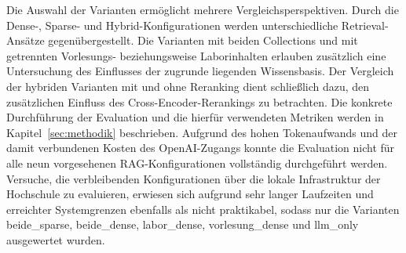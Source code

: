 Die Auswahl der Varianten ermöglicht mehrere Vergleichsperspektiven. Durch die Dense-, Sparse- und Hybrid-Konfigurationen werden unterschiedliche Retrieval-Ansätze gegenübergestellt. Die Varianten mit beiden Collections und mit getrennten Vorlesungs- beziehungsweise Laborinhalten erlauben zusätzlich eine Untersuchung des Einflusses der zugrunde liegenden Wissensbasis. Der Vergleich der hybriden Varianten mit und ohne Reranking dient schließlich dazu, den zusätzlichen Einfluss des Cross-Encoder-Rerankings zu betrachten. Die konkrete Durchführung der Evaluation und die hierfür verwendeten Metriken werden in Kapitel~\ref{sec:methodik} beschrieben. Aufgrund des hohen Tokenaufwands und der damit verbundenen Kosten des OpenAI-Zugangs konnte die Evaluation nicht für alle neun vorgesehenen RAG-Konfigurationen vollständig durchgeführt werden. Versuche, die verbleibenden Konfigurationen über die lokale Infrastruktur der Hochschule zu evaluieren, erwiesen sich aufgrund sehr langer Laufzeiten und erreichter Systemgrenzen ebenfalls als nicht praktikabel, sodass nur die Varianten beide\_sparse, beide\_dense, labor\_dense, vorlesung\_dense und llm\_only ausgewertet wurden.